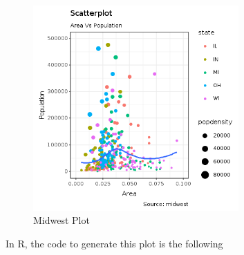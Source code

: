 \documentclass[]{article}
\begin{document}
\begin{figure}
\centering
\includegraphics[width=0.70000\textwidth]{midwest.png}
\caption{Midwest Plot}
\end{figure}

In R, the code to generate this plot is the following
\end{document}
